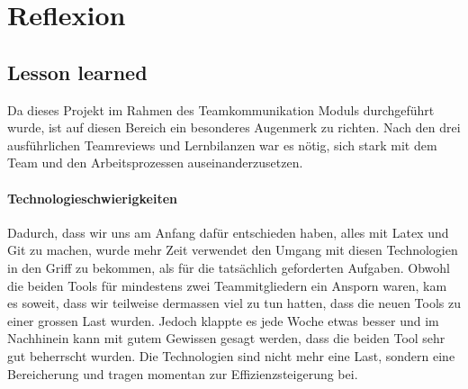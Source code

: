 \chapter{Reflexion}

\section{Lesson learned}

Da dieses Projekt im Rahmen des Teamkommunikation Moduls durchgeführt wurde, ist auf diesen Bereich ein besonderes Augenmerk zu richten. Nach den drei ausführlichen Teamreviews und Lernbilanzen war es nötig, sich stark mit dem Team und den Arbeitsprozessen auseinanderzusetzen. 

\subsubsection{Technologieschwierigkeiten} \label{sec:techn}

Dadurch, dass wir uns am Anfang dafür entschieden haben, alles mit Latex und Git zu machen, wurde mehr Zeit verwendet den Umgang mit diesen Technologien in den Griff zu bekommen, als für die tatsächlich geforderten Aufgaben. Obwohl die beiden Tools für mindestens zwei Teammitgliedern ein Ansporn waren, kam es soweit, dass wir teilweise dermassen viel zu tun hatten, dass die neuen Tools zu einer grossen Last wurden. Jedoch klappte es jede Woche etwas besser und im Nachhinein kann mit gutem Gewissen gesagt werden, dass die beiden Tool sehr gut beherrscht wurden. Die Technologien sind nicht mehr eine Last, sondern eine Bereicherung und tragen momentan zur Effizienzsteigerung bei.

